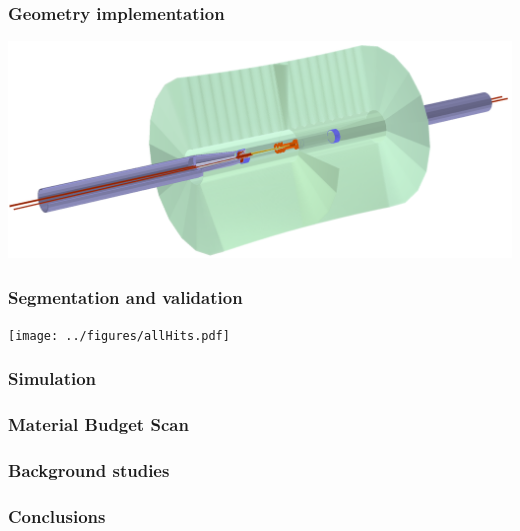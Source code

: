 \documentclass[hyperref={colorlinks=true,pdfpagelabels=false,linkcolor=black}, xcolor=dvipsnames,10pt]{beamer}
\begin{document}
\begin{frame}
	\frametitle{Geometry implementation}
	
	\centering
	\includegraphics[width=\textwidth]{../figures/FCCeeIDEA_IR.png}
\end{frame}

\begin{frame}
	\frametitle{Segmentation and validation}
	
	\centering
	\texttt{[image: ../figures/allHits.pdf]}
	
\end{frame}

\begin{frame}
	\frametitle{Simulation}
\end{frame}


\begin{frame}
	\frametitle{Material Budget Scan}
\end{frame}

\begin{frame}
	\frametitle{Background studies}
\end{frame}

\label{lastslide}
\begin{frame}
  \frametitle{Conclusions}

\end{frame}


\end{document}
